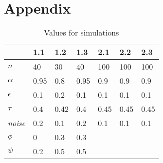 \documentclass{essay-formal}
\begin{document}
\clearpage
\appendix

\section{Appendix}


\begin{table}[htp]
\caption{Values for simulations}
\centering
\begin{tabular}{@{}lllllll@{}}
\toprule
                              & 1.1  & 1.2  & 1.3  & 2.1  & 2.2  & 2.3  \\ \midrule
$n$                           & 40   & 30   & 40   & 100  & 100  & 100  \\
$\alpha$                      & 0.95 & 0.8  & 0.95 & 0.9  & 0.9  & 0.9  \\
$\epsilon$                    & 0.1  & 0.2  & 0.1  & 0.1  & 0.1  & 0.1  \\
$\tau$                        & 0.4  & 0.42 & 0.4  & 0.45 & 0.45 & 0.45 \\
\emph{noise} & 0.2  & 0.1  & 0.2  & 0.1  & 0.1  & 0.1  \\
$\phi$                        & 0    & 0.3  & 0.3  &      &      &      \\
$\psi$                        & 0.2  & 0.5  & 0.5  &      &      &      \\\bottomrule
\end{tabular}
\end{table}


\nocite{schieb2016}
\nocite{onuchowska2019}
\clearpage
\printbibliography

\end{document}
